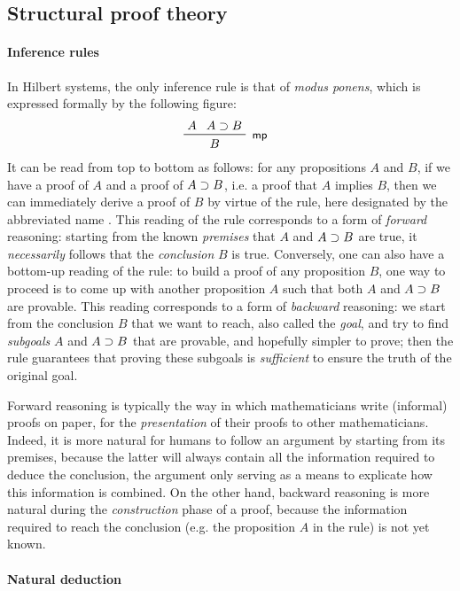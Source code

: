 \subsection{Structural proof theory}

\paragraph{Inference rules}

In Hilbert systems, the only inference rule is that of \emph{modus ponens},
which is expressed formally by the following figure:
$$\R[\rsf{mp}]{A}{A \limp B}{B}$$ It can be read from top to bottom as follows:
for any propositions $A$ and $B$, if we have a proof of $A$ and a proof of $A
\supset B$, i.e. a proof that $A$ implies $B$, then we can immediately derive a
proof of $B$ by virtue of the rule, here designated by the abbreviated name
. This reading of the rule corresponds to a form of \emph{forward}
reasoning: starting from the known \emph{premises} that $A$ and $A \supset B$ are
true, it \emph{necessarily} follows that the \emph{conclusion} $B$ is true.
Conversely, one can also have a bottom-up reading of the rule: to build a proof
of any proposition $B$, one way to proceed is to come up with another
proposition $A$ such that both $A$ and $A \supset B$ are provable. This reading
corresponds to a form of \emph{backward} reasoning: we start from the conclusion
$B$ that we want to reach, also called the \emph{goal}, and try to find
\emph{subgoals} $A$ and $A \supset B$ that are provable, and hopefully simpler to
prove; then the rule guarantees that proving these subgoals is \emph{sufficient}
to ensure the truth of the original goal.

Forward reasoning is typically the way in which mathematicians write (informal)
proofs on paper, for the \emph{presentation} of their proofs to other
mathematicians. Indeed, it is more natural for humans to follow an argument by
starting from its premises, because the latter will always contain all the
information required to deduce the conclusion, the argument only serving as a
means to explicate how this information is combined. On the other hand, backward
reasoning is more natural during the \emph{construction} phase of a proof,
because the information required to reach the conclusion (e.g. the proposition
$A$ in the  rule) is not yet known.

\paragraph{Natural deduction}

